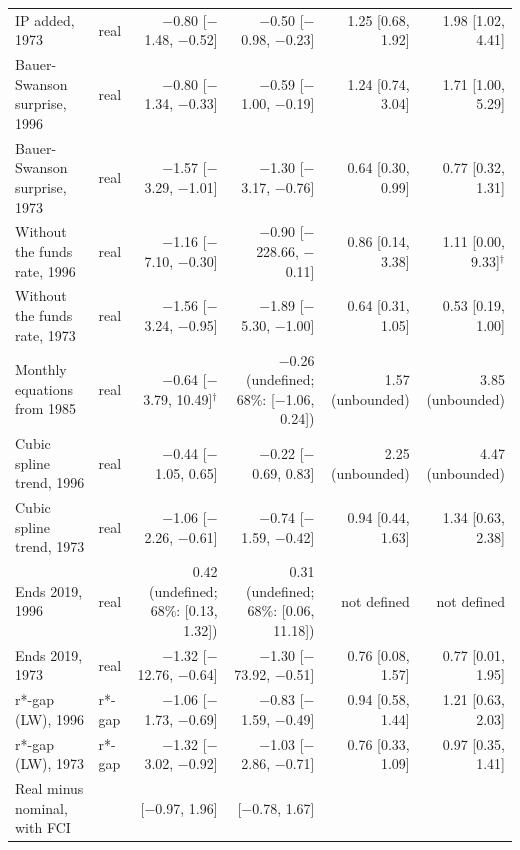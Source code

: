 \begin{table}[tp]
{\begin{tabular}{llrrrr}
IP added, 1973 & real & $-$0.80 [$-$1.48, $-$0.52] & $-$0.50 [$-$0.98, $-$0.23] & 1.25 [0.68, 1.92] & 1.98 [1.02, 4.41]\\
Bauer-Swanson surprise, 1996 & real & $-$0.80 [$-$1.34, $-$0.33] & $-$0.59 [$-$1.00, $-$0.19] & 1.24 [0.74, 3.04] & 1.71 [1.00, 5.29]\\
Bauer-Swanson surprise, 1973 & real & $-$1.57 [$-$3.29, $-$1.01] & $-$1.30 [$-$3.17, $-$0.76] & 0.64 [0.30, 0.99] & 0.77 [0.32, 1.31]\\
Without the funds rate, 1996 & real & $-$1.16 [$-$7.10, $-$0.30] & $-$0.90 [$-$228.66, $-$0.11] & 0.86 [0.14, 3.38] & 1.11 [0.00, 9.33]$^{\dagger}$\\
Without the funds rate, 1973 & real & $-$1.56 [$-$3.24, $-$0.95] & $-$1.89 [$-$5.30, $-$1.00] & 0.64 [0.31, 1.05] & 0.53 [0.19, 1.00]\\
Monthly equations from 1985 & real & $-$0.64 [$-$3.79, 10.49]$^{\dagger}$ & $-$0.26 (undefined; 68\%: [$-$1.06, 0.24]) & 1.57 (unbounded) & 3.85 (unbounded)\\
Cubic spline trend, 1996 & real & $-$0.44 [$-$1.05, 0.65] & $-$0.22 [$-$0.69, 0.83] & 2.25 (unbounded) & 4.47 (unbounded)\\
Cubic spline trend, 1973 & real & $-$1.06 [$-$2.26, $-$0.61] & $-$0.74 [$-$1.59, $-$0.42] & 0.94 [0.44, 1.63] & 1.34 [0.63, 2.38]\\
Ends 2019, 1996 & real & 0.42 (undefined; 68\%: [0.13, 1.32]) & 0.31 (undefined; 68\%: [0.06, 11.18]) & not defined & not defined\\
Ends 2019, 1973 & real & $-$1.32 [$-$12.76, $-$0.64] & $-$1.30 [$-$73.92, $-$0.51] & 0.76 [0.08, 1.57] & 0.77 [0.01, 1.95]\\
r*-gap (LW), 1996 & r*-gap & $-$1.06 [$-$1.73, $-$0.69] & $-$0.83 [$-$1.59, $-$0.49] & 0.94 [0.58, 1.44] & 1.21 [0.63, 2.03]\\
r*-gap (LW), 1973 & r*-gap & $-$1.32 [$-$3.02, $-$0.92] & $-$1.03 [$-$2.86, $-$0.71] & 0.76 [0.33, 1.09] & 0.97 [0.35, 1.41]\\
\addlinespace
Real minus nominal, with FCI & & [$-$0.97, 1.96] & [$-$0.78, 1.67] & & \\
\bottomrule\end{tabular}}

\end{table}
